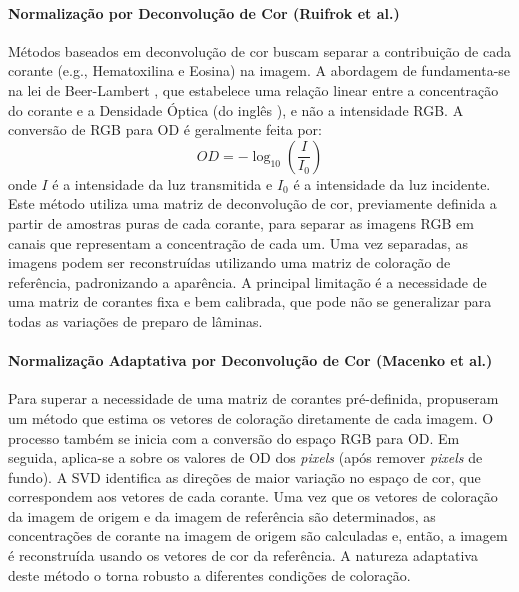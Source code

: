 \paragraph{Normalização por Deconvolução de Cor (Ruifrok et al.)}
Métodos baseados em deconvolução de cor buscam separar a contribuição de cada corante (e.g., Hematoxilina e Eosina) na imagem. A abordagem de \textcite{Ruifrok2001} fundamenta-se na lei de Beer-Lambert \textcite{BeerLambert1962}, que estabelece uma relação linear entre a concentração do corante e a Densidade Óptica (do inglês ), e não a intensidade RGB. A conversão de RGB para OD é geralmente feita por:
\begin{equation}
    OD = -\log_{10}\left(\frac{I}{I_0}\right)
\end{equation}
onde $I$ é a intensidade da luz transmitida e $I_0$ é a intensidade da luz incidente.
Este método utiliza uma matriz de deconvolução de cor, previamente definida a partir de amostras puras de cada corante, para separar as imagens RGB em canais que representam a concentração de cada um. Uma vez separadas, as imagens podem ser reconstruídas utilizando uma matriz de coloração de referência, padronizando a aparência. A principal limitação é a necessidade de uma matriz de corantes fixa e bem calibrada, que pode não se generalizar para todas as variações de preparo de lâminas.

\paragraph{Normalização Adaptativa por Deconvolução de Cor (Macenko et al.)}
Para superar a necessidade de uma matriz de corantes pré-definida, \textcite{Macenko2009} propuseram um método que estima os vetores de coloração diretamente de cada imagem. O processo também se inicia com a conversão do espaço RGB para OD. Em seguida, aplica-se a  sobre os valores de OD dos \textit{pixels} (após remover \textit{pixels} de fundo). A SVD identifica as direções de maior variação no espaço de cor, que correspondem aos vetores de cada corante.
Uma vez que os vetores de coloração da imagem de origem e da imagem de referência são determinados, as concentrações de corante na imagem de origem são calculadas e, então, a imagem é reconstruída usando os vetores de cor da referência. A natureza adaptativa deste método o torna robusto a diferentes condições de coloração.

